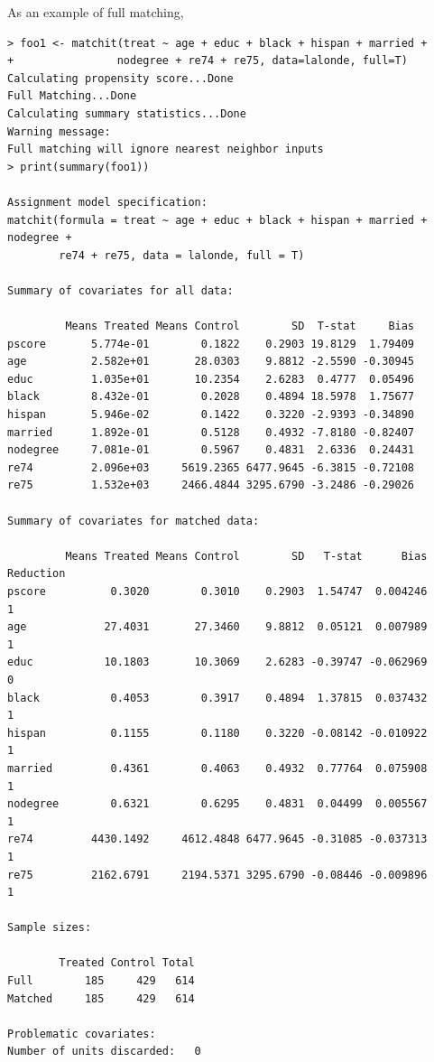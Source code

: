 \documentclass[oneside,letterpaper,titlepage]{article}
\begin{document}
As an example of full matching,

\begin{verbatim}
> foo1 <- matchit(treat ~ age + educ + black + hispan + married +
+                nodegree + re74 + re75, data=lalonde, full=T)
Calculating propensity score...Done
Full Matching...Done
Calculating summary statistics...Done
Warning message: 
Full matching will ignore nearest neighbor inputs 
> print(summary(foo1))

Assignment model specification:
matchit(formula = treat ~ age + educ + black + hispan + married + nodegree + 
        re74 + re75, data = lalonde, full = T)

Summary of covariates for all data:

         Means Treated Means Control        SD  T-stat     Bias
pscore       5.774e-01        0.1822    0.2903 19.8129  1.79409
age          2.582e+01       28.0303    9.8812 -2.5590 -0.30945
educ         1.035e+01       10.2354    2.6283  0.4777  0.05496
black        8.432e-01        0.2028    0.4894 18.5978  1.75677
hispan       5.946e-02        0.1422    0.3220 -2.9393 -0.34890
married      1.892e-01        0.5128    0.4932 -7.8180 -0.82407
nodegree     7.081e-01        0.5967    0.4831  2.6336  0.24431
re74         2.096e+03     5619.2365 6477.9645 -6.3815 -0.72108
re75         1.532e+03     2466.4844 3295.6790 -3.2486 -0.29026

Summary of covariates for matched data:

         Means Treated Means Control        SD   T-stat      Bias Reduction
pscore          0.3020        0.3010    0.2903  1.54747  0.004246         1
age            27.4031       27.3460    9.8812  0.05121  0.007989         1
educ           10.1803       10.3069    2.6283 -0.39747 -0.062969         0
black           0.4053        0.3917    0.4894  1.37815  0.037432         1
hispan          0.1155        0.1180    0.3220 -0.08142 -0.010922         1
married         0.4361        0.4063    0.4932  0.77764  0.075908         1
nodegree        0.6321        0.6295    0.4831  0.04499  0.005567         1
re74         4430.1492     4612.4848 6477.9645 -0.31085 -0.037313         1
re75         2162.6791     2194.5371 3295.6790 -0.08446 -0.009896         1

Sample sizes:

        Treated Control Total
Full        185     429   614
Matched     185     429   614

Problematic covariates:  
Number of units discarded:   0

\end{verbatim}
\end{document}
